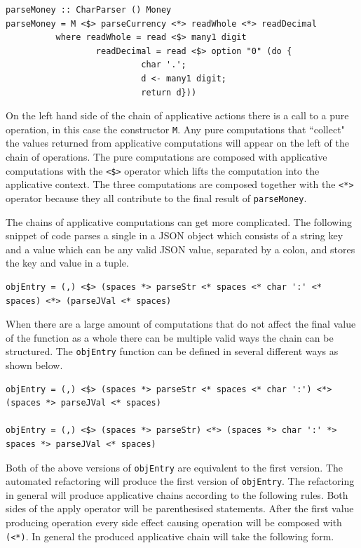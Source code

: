 \begin{lstlisting}[frame=tlrb]
parseMoney :: CharParser () Money
parseMoney = M <$> parseCurrency <*> readWhole <*> readDecimal
          where readWhole = read <$> many1 digit
                  readDecimal = read <$> option "0" (do { 
                           char '.';
                           d <- many1 digit;
                           return d}))
\end{lstlisting}

On the left hand side of the chain of applicative actions there is a call to a pure operation, in this case the constructor \texttt{M}. Any pure computations that ``collect" the values returned from applicative computations will appear on the left of the chain of operations. The pure computations are composed with applicative computations with the \texttt{<\$>} operator which lifts the computation into the applicative context. The three computations are composed together with the \texttt{<*>} operator because they all contribute to the final result of \texttt{parseMoney}.

The chains of applicative computations can get more complicated. The following snippet of code parses a single in a JSON object which consists of a string key and a value which can be any valid JSON value, separated by a colon, and stores the key and value in a tuple. 

\begin{lstlisting}[frame=tblr]
objEntry = (,) <$> (spaces *> parseStr <* spaces <* char ':' <* spaces) <*> (parseJVal <* spaces)
\end{lstlisting}

When there are a large amount of computations that do not affect the final value of the function as a whole there can be multiple valid ways the chain can be structured. The \texttt{objEntry} function can be defined in several different ways as shown below.

\begin{lstlisting}[frame=tblr]
objEntry = (,) <$> (spaces *> parseStr <* spaces <* char ':') <*> (spaces *> parseJVal <* spaces)

objEntry = (,) <$> (spaces *> parseStr) <*> (spaces *> char ':' *> spaces *> parseJVal <* spaces)
\end{lstlisting}

Both of the above versions of \texttt{objEntry} are equivalent to the first version. The automated refactoring will produce the first version of \texttt{objEntry}. The refactoring in general will produce applicative chains according to the following rules. Both sides of the apply operator will be parenthesised statements. After the first value producing operation every side effect causing operation will be composed with \texttt{(<*)}. In general the produced applicative chain will take the following form.

